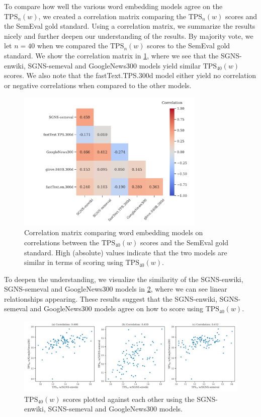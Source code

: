 To compare how well the various word embedding models agree on the $\text{TPS}_n(w)$, we created a correlation matrix comparing the $\text{TPS}_n(w)$ scores and the SemEval gold standard. Using a correlation matrix, we summarize the results nicely and further deepen our understanding of the results. By majority vote, we let $n=40$ when we compared the $\text{TPS}_n(w)$ scores to the SemEval gold standard. We show the correlation matrix in \cref{fig:correlation-matrix-tps-vs-gs}, where we see that the SGNS-enwiki, SGNS-semeval and GoogleNews300 models yield similar $\text{TPS}_{40}(w)$ scores. We also note that the fastText.TPS.300d model either yield no correlation or negative correlations when compared to the other models.
\begin{figure}[H]
    \centering
    \includegraphics[width=0.8\textwidth]{thesis/figures/correlation-matrix-tps-vs-gs.pdf}
    \caption{Correlation matrix comparing word embedding models on correlations between the $\text{TPS}_{40}(w)$ scores and the SemEval gold standard. High (absolute) values indicate that the two models are similar in terms of scoring using $\text{TPS}_{40}(w)$.}
    \label{fig:correlation-matrix-tps-vs-gs}
\end{figure}

To deepen the understanding, we visualize the similarity of the SGNS-enwiki, SGNS-semeval and GoogleNews300 models in \cref{fig:tps-vs-gs-top-3-correlation-word-embedding-models}, where we can see linear relationships appearing. These results suggest that the SGNS-enwiki, SGNS-semeval and GoogleNews300 models agree on how to score using $\text{TPS}_{40}(w)$.
\begin{figure}[H]
    \centering
    \includegraphics[width=\textwidth]{thesis/figures/tps-vs-gs-top-3-correlation-word-embedding-models.pdf}
    \caption{$\text{TPS}_{40}(w)$ scores plotted against each other using the SGNS-enwiki, SGNS-semeval and GoogleNews300 models.}
    \label{fig:tps-vs-gs-top-3-correlation-word-embedding-models}
\end{figure}

